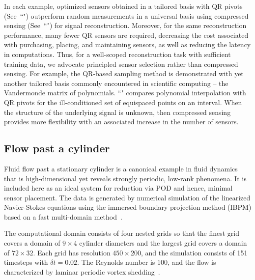 \documentclass[letterpaper]{IEEEtran}
\begin{document}
In each example, optimized sensors obtained in a tailored basis with QR pivots (See~``") outperform random measurements in a universal basis using compressed sensing (See~``") for signal reconstruction.  
Moreover, for the same reconstruction performance, many fewer QR sensors are required, decreasing the cost associated with purchasing, placing, and maintaining sensors, as well as reducing the latency in computations.  
Thus, for a well-scoped reconstruction task with sufficient training data, we advocate principled sensor selection rather than compressed sensing. 
For example, the QR-based sampling method is demonstrated with yet another tailored basis commonly encountered in scientific computing -- the Vandermonde matrix of polynomials. ``" compares polynomial interpolation with QR pivots for the ill-conditioned set of equispaced points on an interval.
When the structure of the underlying signal is unknown, then compressed sensing provides more flexibility with an associated increase in the number of sensors.  

\subsection{Flow past a cylinder}

Fluid flow past a stationary cylinder is a canonical example in fluid dynamics that is high-dimensional yet reveals strongly periodic, low-rank phenomena. 
It is included here as an ideal system for reduction via POD and hence, minimal sensor placement. 
The data is generated by numerical simulation of the linearized Navier-Stokes equations using the immersed boundary projection method (IBPM) based on a fast multi-domain method~\cite{taira:07ibfs,taira:fastIBPM}. 

The computational domain consists of four nested grids so that the finest grid covers a domain of $9\times 4$ cylinder diameters and the largest grid covers a domain of $72\times 32$.  Each grid has resolution $450\times 200$, and the simulation consists of 151 timesteps with ${\delta t=0.02}$.  The Reynolds number is 100, and the flow is characterized by laminar periodic vortex shedding~\cite{Noack2003jfm}. 
\end{document}
